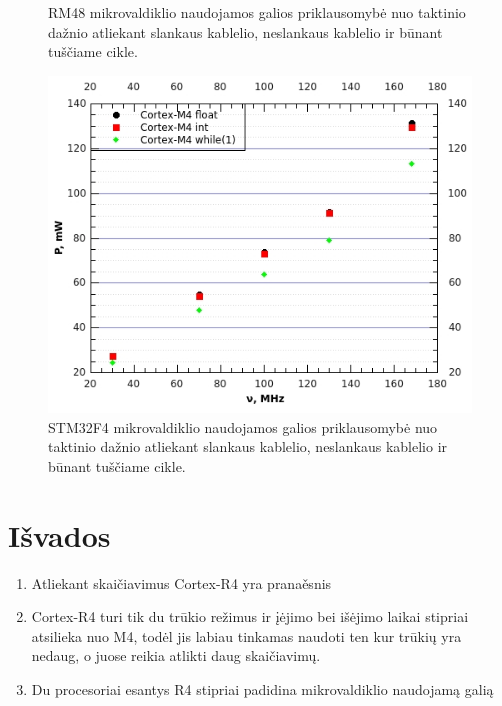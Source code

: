 \documentclass[a4paper, 12pt]{article} %
\begin{document}
\begin{onehalfspacing}
\begin{figure}[H]
\captionsetup{labelformat=numbfirst} %
\captionsetup{labelseparator=tarpas}
\caption{RM48 mikrovaldiklio naudojamos galios priklausomyb\.e nuo taktinio da\v{z}nio atliekant slankaus kablelio, neslankaus kablelio ir b\=unant tu\v{s}\v{c}iame cikle.}
\label{vienas}
\end{figure}
\begin{figure}[H] %
\centering %
\includegraphics[scale=0.8]{pav/M4galia.jpg} %
\captionsetup{labelformat=numbfirst} %
\captionsetup{labelseparator=tarpas}
\caption{STM32F4 mikrovaldiklio naudojamos galios priklausomyb\.e nuo taktinio da\v{z}nio atliekant slankaus kablelio, neslankaus kablelio ir b\=unant tu\v{s}\v{c}iame cikle.}
\label{vienas}
\end{figure}

\newpage
\section{I\v{s}vados}


\begin{enumerate}
\item Atliekant skai\v{c}iavimus Cortex-R4 yra prana\v{e}snis
\item Cortex-R4 turi tik du tr\=ukio re\v{z}imus ir \k{i}\.ejimo bei i\v{s}\.ejimo laikai stipriai atsilieka nuo M4, tod\.el jis labiau tinkamas naudoti ten kur tr\=uki\k{u} yra nedaug, o juose reikia atlikti daug skai\v{c}iavim\k{u}.
\item Du procesoriai esantys R4 stipriai padidina mikrovaldiklio naudojam\k{a} gali\k{a}
\end{enumerate}


\end{onehalfspacing}
\end{document}

